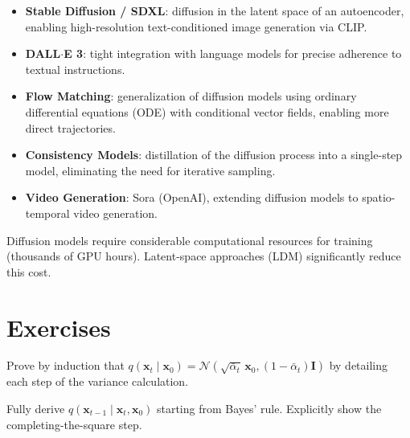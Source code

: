 \begin{sota}[title=\textbf{Diffusion Models in 2024--2025}]
\begin{itemize}
    \item \textbf{Stable Diffusion / SDXL}: diffusion in the latent space
          of an autoencoder, enabling high-resolution text-conditioned image
          generation via CLIP.
    \item \textbf{DALL$\cdot$E 3}: tight integration with language models
          for precise adherence to textual instructions.
    \item \textbf{Flow Matching}: generalization of diffusion
          models using ordinary differential equations (ODE) with conditional
          vector fields, enabling more direct trajectories.
    \item \textbf{Consistency Models}: distillation
          of the diffusion process into a single-step model, eliminating
          the need for iterative sampling.
    \item \textbf{Video Generation}: Sora (OpenAI), extending diffusion
          models to spatio-temporal video generation.
\end{itemize}
\end{sota}

\begin{warning}
Diffusion models require considerable computational resources
for training (thousands of GPU hours). Latent-space approaches
(LDM) significantly reduce this cost.
\end{warning}

\section{Exercises}
\label{sec:diffusion-exercises}

\begin{exercise}
\label{exo:closed-form}
Prove by induction that $q(\mathbf{x}_t \mid \mathbf{x}_0) = \mathcal{N}(\sqrt{\bar{\alpha}_t}\,\mathbf{x}_0, (1 - \bar{\alpha}_t)\mathbf{I})$
by detailing each step of the variance calculation.
\end{exercise}

\begin{exercise}
\label{exo:posterior}
Fully derive $q(\mathbf{x}_{t-1} \mid \mathbf{x}_t, \mathbf{x}_0)$
starting from Bayes' rule. Explicitly show the completing-the-square
step.
\end{exercise}

